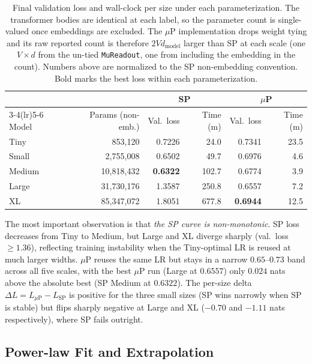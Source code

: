 \documentclass[a4paper]{article}
\begin{document}
\begin{table}[H]
\centering
\small
\begin{tabular}{lrrrrr}
\toprule
& & \multicolumn{2}{c}{\textbf{SP}} & \multicolumn{2}{c}{\textbf{$\mu$P}} \\
\cmidrule(lr){3-4}\cmidrule(lr){5-6}
Model & Params (non-emb.) & Val.\ loss & Time (m) & Val.\ loss & Time (m) \\
\midrule
Tiny    & 853{,}120     & 0.7226           & 24.0  & 0.7341 & 23.5 \\
Small   & 2{,}755{,}008  & 0.6502           & 49.7  & 0.6976 & 4.6 \\
Medium  & 10{,}818{,}432 & \textbf{0.6322}  & 102.7 & 0.6774 & 3.9 \\
Large   & 31{,}730{,}176 & 1.3587           & 250.8 & 0.6557 & 7.2 \\
XL      & 85{,}347{,}072 & 1.8051           & 677.8 & \textbf{0.6944} & 12.5 \\
\bottomrule
\end{tabular}


\caption{Final validation loss and wall-clock per size under each parameterization. The transformer bodies are identical at each label, so the parameter count is single-valued once embeddings are excluded. The $\mu$P implementation drops weight tying and its raw reported count is therefore $2 V d_{\text{model}}$ larger than SP at each scale (one $V{\times}d$ from the un-tied \texttt{MuReadout}, one from including the embedding in the count). Numbers above are normalized to the SP non-embedding convention. Bold marks the best loss within each parameterization.}
\label{tab:scaling_results}
\end{table}

The most important observation is that \emph{the SP curve is non-monotonic}. SP loss decreases from Tiny to Medium, but Large and XL diverge sharply (val.\ loss $\geq 1.36$), reflecting training instability when the Tiny-optimal LR is reused at much larger widths. $\mu$P reuses the same LR but stays in a narrow $0.65$--$0.73$ band across all five scales, with the best $\mu$P run (Large at $0.6557$) only $0.024$ nats above the absolute best (SP Medium at $0.6322$). The per-size delta $\Delta L = L_{\mu\mathrm{P}} - L_{\mathrm{SP}}$ is positive for the three small sizes (SP wins narrowly when SP is stable) but flips sharply negative at Large and XL ($-0.70$ and $-1.11$ nats respectively), where SP fails outright.

\subsection{Power-law Fit and Extrapolation}
\end{document}
